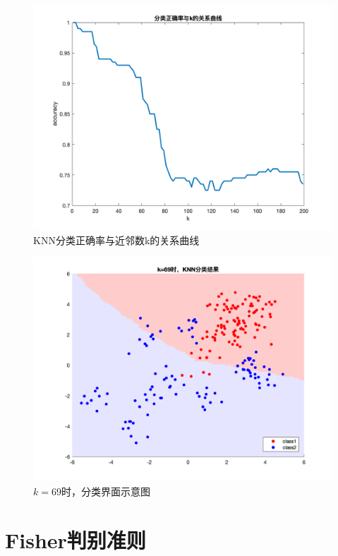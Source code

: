 \documentclass[cn]{elegantbook}
\begin{document}
\begin{figure}[!h]
	\centering
	\includegraphics[width=\textwidth]{images/knnres5}
	\caption{\label{fig3}KNN分类正确率与近邻数k的关系曲线}
\end{figure}

\begin{figure}[!h]
	\centering
	\includegraphics[width=\textwidth]{images/knnres6}
	\caption{\label{fig4}$k=69$时，分类界面示意图}
\end{figure}

\chapter{Fisher判别准则}
\end{document}
